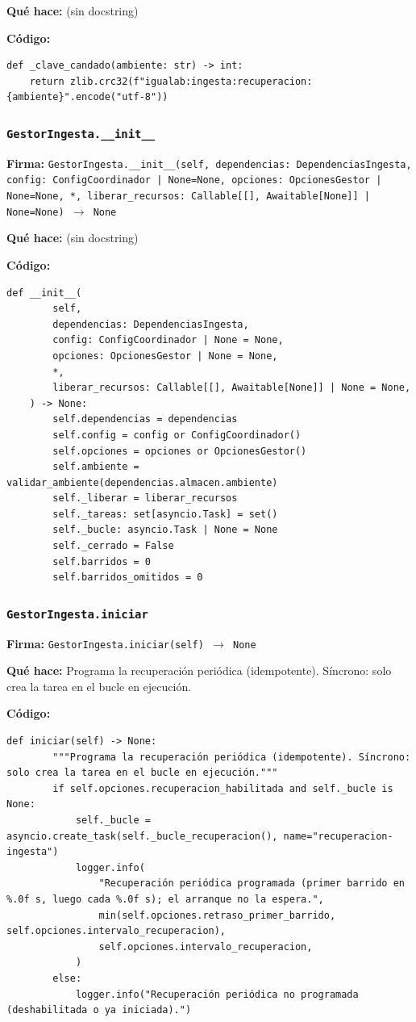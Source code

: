 \documentclass[11pt,a4paper]{article}
\begin{document}
\textbf{Qué hace:} (sin docstring)

\textbf{Código:}
\begin{lstlisting}
def _clave_candado(ambiente: str) -> int:
    return zlib.crc32(f"igualab:ingesta:recuperacion:{ambiente}".encode("utf-8"))
\end{lstlisting}

\subsubsection*{\texttt{GestorIngesta.\_\_init\_\_}}
\textbf{Firma:} \texttt{GestorIngesta.\_\_init\_\_(self, dependencias: DependenciasIngesta, config: ConfigCoordinador | None=None, opciones: OpcionesGestor | None=None, *, liberar\_recursos: Callable[[], Awaitable[None]] | None=None) $\rightarrow$ None}

\textbf{Qué hace:} (sin docstring)

\textbf{Código:}
\begin{lstlisting}
def __init__(
        self,
        dependencias: DependenciasIngesta,
        config: ConfigCoordinador | None = None,
        opciones: OpcionesGestor | None = None,
        *,
        liberar_recursos: Callable[[], Awaitable[None]] | None = None,
    ) -> None:
        self.dependencias = dependencias
        self.config = config or ConfigCoordinador()
        self.opciones = opciones or OpcionesGestor()
        self.ambiente = validar_ambiente(dependencias.almacen.ambiente)
        self._liberar = liberar_recursos
        self._tareas: set[asyncio.Task] = set()
        self._bucle: asyncio.Task | None = None
        self._cerrado = False
        self.barridos = 0
        self.barridos_omitidos = 0
\end{lstlisting}

\subsubsection*{\texttt{GestorIngesta.iniciar}}
\textbf{Firma:} \texttt{GestorIngesta.iniciar(self) $\rightarrow$ None}

\textbf{Qué hace:} Programa la recuperación periódica (idempotente). Síncrono: solo crea la tarea en el bucle en ejecución.

\textbf{Código:}
\begin{lstlisting}
def iniciar(self) -> None:
        """Programa la recuperación periódica (idempotente). Síncrono: solo crea la tarea en el bucle en ejecución."""
        if self.opciones.recuperacion_habilitada and self._bucle is None:
            self._bucle = asyncio.create_task(self._bucle_recuperacion(), name="recuperacion-ingesta")
            logger.info(
                "Recuperación periódica programada (primer barrido en %.0f s, luego cada %.0f s); el arranque no la espera.",
                min(self.opciones.retraso_primer_barrido, self.opciones.intervalo_recuperacion),
                self.opciones.intervalo_recuperacion,
            )
        else:
            logger.info("Recuperación periódica no programada (deshabilitada o ya iniciada).")
\end{lstlisting}
\end{document}
